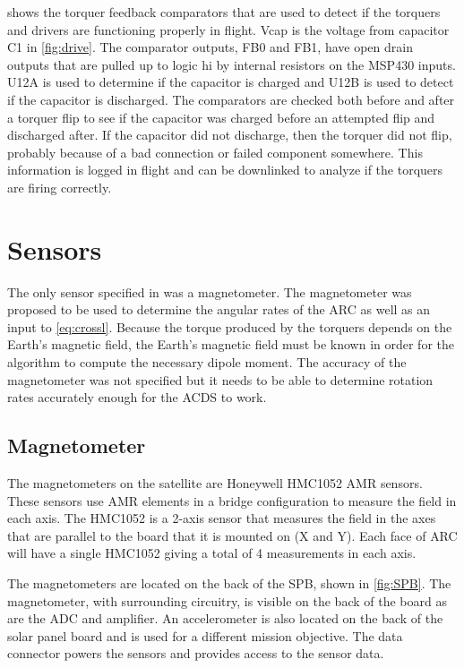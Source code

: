  shows the torquer feedback comparators that are used to detect if the torquers and drivers are functioning properly in flight. Vcap is the voltage from capacitor C1 in \cref{fig:drive}. The comparator outputs, FB0 and FB1, have open drain outputs that are pulled up to logic hi by internal resistors on the MSP430 inputs. U12A  is used to determine if the capacitor is charged and U12B is used to detect if the capacitor is discharged. The comparators are checked both before and after a torquer flip to see if the capacitor was charged before an attempted flip and discharged after. If the capacitor did not discharge, then the torquer did not flip, probably because of a bad connection or failed component somewhere. This information is logged in flight and can be downlinked to analyze if the torquers are firing correctly.

\section{Sensors}

The only sensor specified in \cite{Mentch11} was a magnetometer. The magnetometer was proposed to be used to determine the angular rates of the \ac{ARC} as well as an input to \cref{eq:crossl}. Because the torque produced by the torquers depends on the Earth's magnetic field, the Earth's magnetic field must be known in order for the algorithm to compute the necessary dipole moment. The accuracy of the magnetometer was not specified but it needs to be able to determine rotation rates accurately enough for the \ac{ACDS} to work.

\subsection{Magnetometer}

The magnetometers on the satellite are Honeywell HMC1052 \ac{AMR} sensors. These sensors use \ac{AMR} elements in a bridge configuration to measure the field in each axis. The HMC1052 is a 2-axis sensor that measures the field in the axes that are parallel to the board that it is mounted on (X and Y). Each face of \ac{ARC} will have a single HMC1052 giving a total of 4 measurements in each axis.

The magnetometers are located on the back of the \acs{SPB}, shown in \cref{fig:SPB}. The magnetometer, with surrounding circuitry, is visible on the back of the board as are the \ac{ADC} and amplifier. An accelerometer is also located on the back of the solar panel board and is used for a different mission objective. The data connector powers the sensors and provides access to the sensor data.

